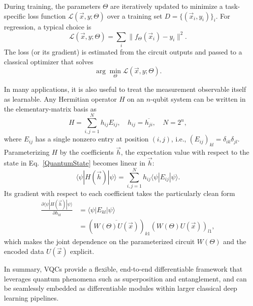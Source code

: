 \documentclass[conference]{IEEEtran}
\begin{document}
During training, the parameters $\Theta$ are iteratively updated to minimize a task-specific loss function $\mathcal{L}(\overrightarrow{x}, y; \Theta)$ over a training set $D=\{(\overrightarrow{x}_i, y_i)\}_i$. For regression, a typical choice is
\begin{equation}
\mathcal{L}(\overrightarrow{x}, y; \Theta) = \sum_i \| f_{\Theta}(\overrightarrow{x}_i) - y_i \|^2.
\end{equation}
The loss (or its gradient) is estimated from the circuit outputs and passed to a classical optimizer that solves
\begin{equation}
\arg\min_{\Theta}\mathcal{L}(\overrightarrow{x},y; \Theta).
\end{equation}

In many applications, it is also useful to treat the measurement observable itself as learnable. Any Hermitian operator $H$ on an $n$-qubit system can be written in the elementary-matrix basis as
\begin{equation}
    H = \sum_{i,j=1}^{N} h_{ij}E_{ij}, \quad h_{ij}=\overline{h_{ji}}, \quad N=2^n,
\end{equation}
where $E_{ij}$ has a single nonzero entry at position $(i,j)$, i.e., $(E_{ij})_{kl}=\delta_{ik}\delta_{jl}$. Parameterizing $H$ by the coefficients $\overrightarrow{h}$, the expectation value with respect to the state in Eq.~\eqref{QuantumState} becomes linear in $\overrightarrow{h}$:
\begin{equation}
    \langle\psi|H(\overrightarrow{h})|\psi\rangle = \sum_{i,j=1}^{N}h_{ij}\langle\psi|E_{ij}|\psi\rangle.
\end{equation}
Its gradient with respect to each coefficient takes the particularly clean form
\begin{align}
    \frac{\partial \langle\psi|H(\overrightarrow{h})|\psi\rangle}{\partial h_{kl}} &= \langle\psi|E_{kl}|\psi\rangle \nonumber \\
    &= \left(\overline{W(\Theta)U(\overrightarrow{x})}\right)_{k1}\left(W(\Theta)U(\overrightarrow{x})\right)_{l1},
\end{align}
which makes the joint dependence on the parameterized circuit $W(\Theta)$ and the encoded data $U(\overrightarrow{x})$ explicit.

In summary, VQCs provide a flexible, end-to-end differentiable framework that leverages quantum phenomena such as superposition and entanglement, and can be seamlessly embedded as differentiable modules within larger classical deep learning pipelines.
\end{document}
